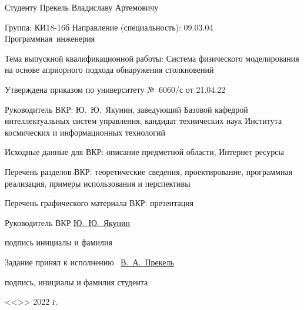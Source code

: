 {
Студенту Прекель Владиславу Артемовичу

Группа: КИ18-16б Направление (специальность): 09.03.04 Программная~инженерия

Тема выпускной квалификационной работы: Система физического моделирования на основе априорного подхода обнаружения столкновений

Утверждена приказом по университету №~6060/с от 21.04.22

Руководитель ВКР: Ю.~Ю.~Якунин, заведующий Базовой кафедрой интеллектуальных систем управления, кандидат технических наук
Института космических и информационных технологий

Исходные данные для ВКР: описание предметной области, Интернет ресурсы

Перечень разделов ВКР: теоретические сведения, проектирование, программная реализация, примеры использования и перспективы

Перечень графического материала ВКР: презентация

\vfill

\setlength{\parindent}{0cm}

Руководитель ВКР
\hfill
\uline{\hspace{10.5ex}}
\hspace{6ex}
\uline{Ю.~Ю.~Якунин}

\vspace{-4pt}

\hfill
{\footnotesize подпись}
\hspace{8.5ex}
{\footnotesize инициалы и фамилия}

Задание принял к исполнению~
\hfill
\uline{\hspace{18.5ex}В.~А.~Прекель}

\vspace{-4pt}

\hfill
{\footnotesize подпись, инициалы и фамилия студента}

\vspace{1em}

\hfill <<\uline{\hspace{3ex}}>> \uline{\hspace{9ex}} 2022 г.
}

\thispagestyle{empty}

\clearpage
